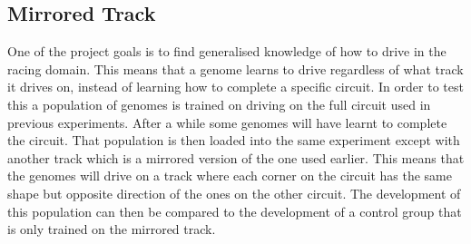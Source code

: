 




\subsection{Mirrored Track}
One of the project goals is to find generalised knowledge of how to drive in the racing domain. This means that a genome learns to drive regardless of what track it drives on, instead of learning how to complete a specific circuit. In order to test this a population of genomes is trained on driving on the full circuit used in previous experiments. After a while some genomes will have learnt to complete the circuit. That population is then loaded into the same experiment except with another track which is a mirrored version of the one used earlier. This means that the genomes will drive on a track where each corner on the circuit has the same shape but opposite direction of the ones on the other circuit. The development of this population can then be compared to the development of a control group that is only trained on the mirrored track. 

